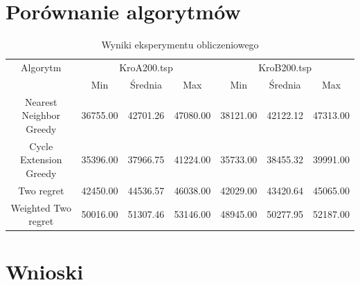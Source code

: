 \documentclass[11pt]{article}
\begin{document}
\section{Porównanie algorytmów}\label{sec:porównanie-algorytmów}
\begin{table}[H]
    \centering
    \begin{tabular}{|c||c|c|c||c|c|c|}
        \hline
        Algorytm & \multicolumn{3}{c||}{KroA200.tsp} & \multicolumn{3}{c|}{KroB200.tsp} \\
        \cline{2-4} \cline{5-7}
        & Min & Średnia & Max & Min & Średnia & Max   \\
        \hline
        Nearest Neighbor Greedy & 36755.00 & 42701.26 & 47080.00 & 38121.00 & 42122.12 & 47313.00 \\
        \hline
        Cycle Extension Greedy & 35396.00 & 37966.75 & 41224.00 & 35733.00 & 38455.32 &  39991.00 \\
        \hline
        Two regret & 42450.00 & 44536.57 & 46038.00 & 42029.00 & 43420.64 & 45065.00 \\
        \hline
        Weighted Two regret & 50016.00 & 51307.46 & 53146.00 & 48945.00 & 50277.95 & 52187.00 \\
        \hline
    \end{tabular}
    \caption{Wyniki eksperymentu obliczeniowego}
    \label{tab:wyniki-eksperymentu}
\end{table}

\section{Wnioski}\label{sec:wnioski}
\end{document}
